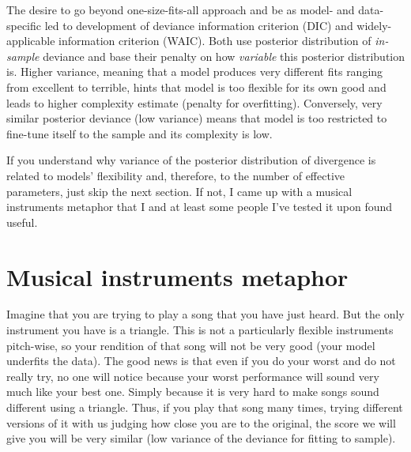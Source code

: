 \documentclass[
]{book}
\begin{document}
The desire to go beyond one-size-fits-all approach and be as model- and data-specific led to development of deviance information criterion (DIC) and widely-applicable information criterion (WAIC). Both use posterior distribution of \emph{in-sample} deviance and base their penalty on how \emph{variable} this posterior distribution is. Higher variance, meaning that a model produces very different fits ranging from excellent to terrible, hints that model is too flexible for its own good and leads to higher complexity estimate (penalty for overfitting). Conversely, very similar posterior deviance (low variance) means that model is too restricted to fine-tune itself to the sample and its complexity is low.

If you understand why variance of the posterior distribution of divergence is related to models' flexibility and, therefore, to the number of effective parameters, just skip the next section. If not, I came up with a musical instruments metaphor that I and at least some people I've tested it upon found useful.

\hypertarget{musical-instruments-metaphor}{%
\section{Musical instruments metaphor}\label{musical-instruments-metaphor}}

Imagine that you are trying to play a song that you have just heard. But the only instrument you have is a triangle. This is not a particularly flexible instruments pitch-wise, so your rendition of that song will not be very good (your model underfits the data). The good news is that even if you do your worst and do not really try, no one will notice because your worst performance will sound very much like your best one. Simply because it is very hard to make songs sound different using a triangle. Thus, if you play that song many times, trying different versions of it with us judging how close you are to the original, the score we will give you will be very similar (low variance of the deviance for fitting to sample).
\end{document}
